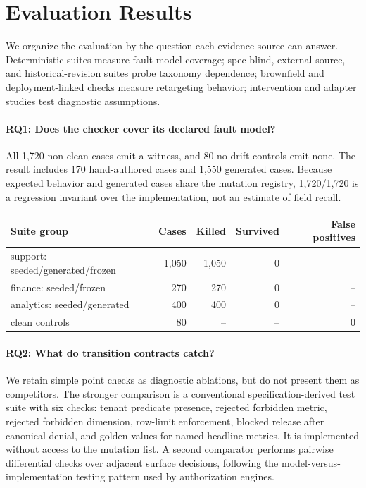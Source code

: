 \section{Evaluation Results}

We organize the evaluation by the question each evidence source can answer. Deterministic suites measure fault-model coverage; spec-blind, external-source, and historical-revision suites probe taxonomy dependence; brownfield and deployment-linked checks measure retargeting behavior; intervention and adapter studies test diagnostic assumptions.

\paragraph{RQ1: Does the checker cover its declared fault model?}
All 1,720 non-clean cases emit a witness, and 80 no-drift controls emit none. The result includes 170 hand-authored cases and 1,550 generated cases. Because expected behavior and generated cases share the mutation registry, 1,720/1,720 is a regression invariant over the implementation, not an estimate of field recall.

\begin{center}
\scriptsize
\setlength{\tabcolsep}{2pt}
\begin{tabular}{@{}L{0.38\columnwidth}rrrr@{}}
\toprule
Suite group & Cases & Killed & Survived & False positives \\
\midrule
support: seeded/generated/frozen & 1,050 & 1,050 & 0 & -- \\
finance: seeded/frozen & 270 & 270 & 0 & -- \\
analytics: seeded/generated & 400 & 400 & 0 & -- \\
clean controls & 80 & -- & -- & 0 \\
\bottomrule
\end{tabular}
\end{center}

\paragraph{RQ2: What do transition contracts catch?}
We retain simple point checks as diagnostic ablations, but do not present them as competitors. The stronger comparison is a conventional specification-derived test suite with six checks: tenant predicate presence, rejected forbidden metric, rejected forbidden dimension, row-limit enforcement, blocked release after canonical denial, and golden values for named headline metrics. It is implemented without access to the mutation list. A second comparator performs pairwise differential checks over adjacent surface decisions, following the model-versus-implementation testing pattern used by authorization engines.

